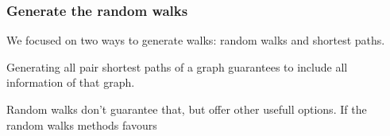 \subsubsection{Generate the random walks}
We focused on two ways to generate walks: random walks and shortest paths.

Generating all pair shortest paths of a graph guarantees to include all information of that graph.

Random walks don't guarantee that, but offer other usefull options. If the random walks methods favours

